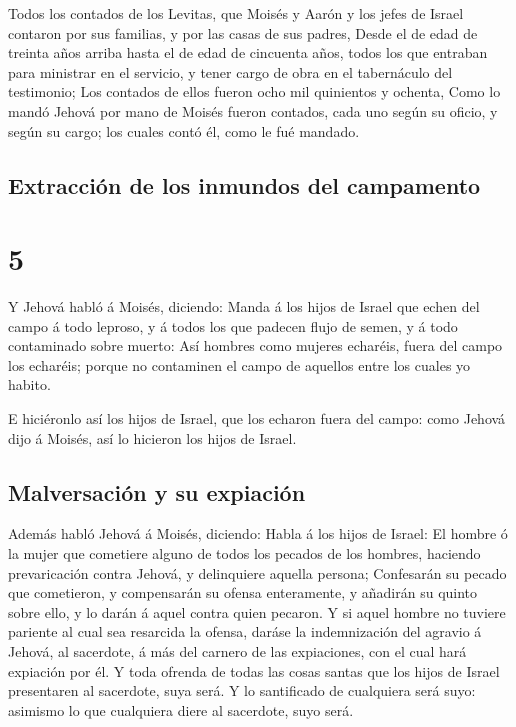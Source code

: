  Todos los contados de los Levitas, que Moisés y Aarón y
los jefes de Israel contaron por sus familias, y por las casas de sus
padres,  Desde el de edad de treinta años arriba hasta el
de edad de cincuenta años, todos los que entraban para ministrar en el
servicio, y tener cargo de obra en el tabernáculo del testimonio;
 Los contados de ellos fueron ocho mil quinientos y
ochenta,  Como lo mandó Jehová por mano de Moisés fueron
contados, cada uno según su oficio, y según su cargo; los cuales contó
él, como le fué mandado.

\hypertarget{extracciuxf3n-de-los-inmundos-del-campamento}{%
\subsection{Extracción de los inmundos del
campamento}\label{extracciuxf3n-de-los-inmundos-del-campamento}}

\hypertarget{section-04-5}{%
\section{5}\label{section-04-5}}

 Y Jehová habló á Moisés, diciendo:  Manda á
los hijos de Israel que echen del campo á todo leproso, y á todos los
que padecen flujo de semen, y á todo contaminado sobre muerto:
 Así hombres como mujeres echaréis, fuera del campo los
echaréis; porque no contaminen el campo de aquellos entre los cuales yo
habito.

 E hiciéronlo así los hijos de Israel, que los echaron
fuera del campo: como Jehová dijo á Moisés, así lo hicieron los hijos de
Israel.

\hypertarget{malversaciuxf3n-y-su-expiaciuxf3n}{%
\subsection{Malversación y su
expiación}\label{malversaciuxf3n-y-su-expiaciuxf3n}}

 Además habló Jehová á Moisés, diciendo: 
Habla á los hijos de Israel: El hombre ó la mujer que cometiere alguno
de todos los pecados de los hombres, haciendo prevaricación contra
Jehová, y delinquiere aquella persona;  Confesarán su
pecado que cometieron, y compensarán su ofensa enteramente, y añadirán
su quinto sobre ello, y lo darán á aquel contra quien pecaron.
 Y si aquel hombre no tuviere pariente al cual sea
resarcida la ofensa, daráse la indemnización del agravio á Jehová, al
sacerdote, á más del carnero de las expiaciones, con el cual hará
expiación por él.  Y toda ofrenda de todas las cosas
santas que los hijos de Israel presentaren al sacerdote, suya será.
 Y lo santificado de cualquiera será suyo: asimismo lo
que cualquiera diere al sacerdote, suyo será.

